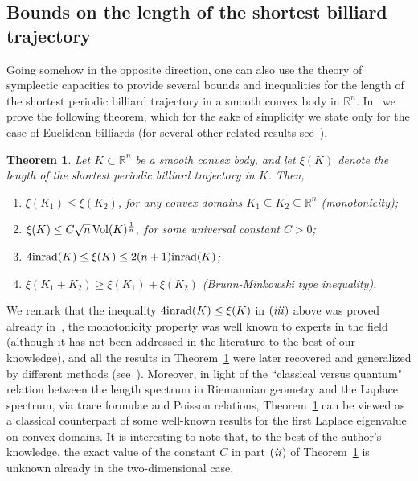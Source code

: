 \documentclass{icmart}
\newtheorem{theorem}{Theorem}[section]
\theoremstyle{definition}
\begin{document}
\subsection{Bounds on the length of the shortest billiard trajectory}


Going somehow in the opposite direction,  %
one can also use  the theory of symplectic capacities to provide
several bounds and inequalities for the length of the shortest periodic
billiard trajectory in a smooth convex body in ${\mathbb R}^n$. 
In~\cite{AAO1} we prove the following theorem, which for the sake of simplicity we state only for the case of Euclidean billiards (for several other related results see~\cite{ABKS,AM,BB,Gh,IrirKei1, IrieKei2,V}). 
%
\begin{theorem} \label{THM-Billiard} Let  $K \subset {\mathbb R}^n$ be a smooth convex body, and let $\xi(K)$ denote the length of the shortest periodic billiard trajectory in $K$. Then, 
\begin{enumerate}
\item[(i)] $\xi(K_1) \leq \xi(K_2)$, for any convex domains $K_1 \subseteq K_2 \subseteq {\mathbb R}^n$ (monotonicity);
\item[(ii)] $\xi(K) \leq C \sqrt n \, {\rm Vol}(K)^{\frac 1 n},$ for some universal constant $C>0$;
\item[(iii)] $4  {\rm inrad}(K) \leq \xi(K) \leq 2 (n+1) {\rm inrad}(K)$;
\item[(iv)] $\xi(K_1 + K_2) \geq \xi(K_1) + \xi(K_2)$ (Brunn-Minkowski type inequality). 
\end{enumerate}
\end{theorem} 
We remark that the inequality $4 {\rm inrad}(K) \leq \xi(K)$ in ${\it (iii)}$ above was proved already in~\cite{Gh}, the monotonicity property was  
well known to experts in the field (although it has not been addressed in the literature to the best of our knowledge), and  all the results in Theorem~\ref{THM-Billiard} were later recovered and generalized by different methods (see~\cite{ABKS,IrirKei1, IrieKei2}).
Moreover, in light of the ``classical versus quantum" relation between the length spectrum in Riemannian geometry
and the Laplace spectrum, via trace formulae and Poisson relations, Theorem~\ref{THM-Billiard} %
can be viewed as
a classical counterpart of some  well-known results  for the first Laplace eigenvalue %
on convex domains. It is interesting to note that, to the best of the author's knowledge, the exact value of the constant $C$ in part  ${\it (ii)}$ of Theorem~\ref{THM-Billiard}   is unknown already in the two-dimensional case. 
\end{document}
